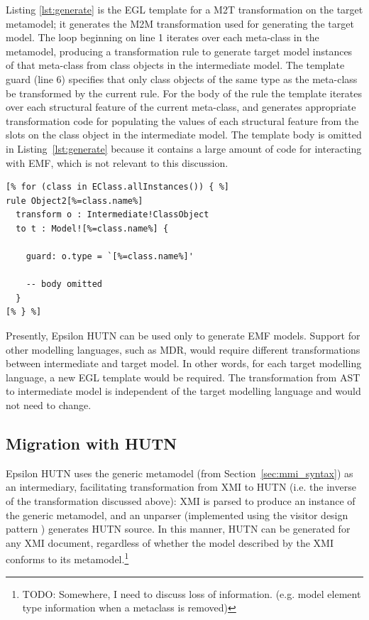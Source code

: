 Listing \ref{lst:generate} is the EGL template for a M2T transformation on the target metamodel; it generates the M2M transformation used for generating the target model. The loop beginning on line 1 iterates over each meta-class in the metamodel, producing a transformation rule to generate target model instances of that meta-class from class objects in the intermediate model. The template guard (line 6) specifies that only class objects of the same type as the meta-class be transformed by the current rule. For the body of the rule the template iterates over each structural feature of the current meta-class, and generates appropriate transformation code for populating the values of each structural feature from the slots on the class object in the intermediate model. The template body is omitted in Listing~\ref{lst:generate} because it contains a large amount of code for interacting with EMF, which is not relevant to this discussion.

\begin{lstlisting}[caption= Initial sections of the template (in EGL) for generating  rules (in ETL) to instantiate classes of the target metamodel., label=lst:generate, language=EOL]
[% for (class in EClass.allInstances()) { %]
rule Object2[%=class.name%]
  transform o : Intermediate!ClassObject
  to t : Model![%=class.name%] {

    guard: o.type = `[%=class.name%]'

    -- body omitted
  }
[% } %]
\end{lstlisting}

Presently, Epsilon HUTN can be used only to generate EMF models. Support for other modelling languages, such as MDR, would require different transformations between intermediate and target model. In other words, for each target modelling language, a new EGL template would be required. The transformation from AST to intermediate model is independent of the target modelling language and would not need to change.


\subsection{Migration with HUTN}
\label{subsec:migration_with_hutn}
Epsilon HUTN uses the generic metamodel (from Section~\ref{sec:mmi_syntax}) as an intermediary, facilitating transformation from XMI to HUTN (i.e. the inverse of the transformation discussed above): XMI is parsed to produce an instance of the generic metamodel, and an unparser (implemented using the visitor design pattern \cite{gamma95patterns}) generates HUTN source. In this manner, HUTN can be generated for any XMI document, regardless of whether the model described by the XMI conforms to its metamodel.\footnote{TODO: Somewhere, I need to discuss loss of information. (e.g. model element type information when a metaclass is removed)}

